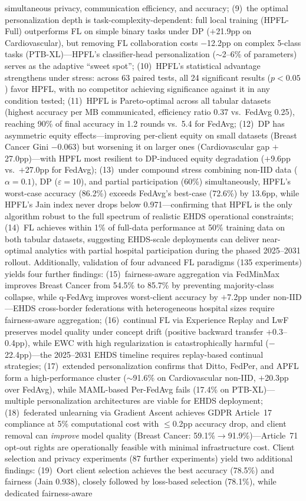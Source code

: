\documentclass[conference,a4paper]{IEEEtran}
\begin{document}
simultaneous privacy, communication efficiency, and accuracy; (9)~the optimal personalization depth is task-complexity-dependent: full local training (HPFL-Full) outperforms FL on simple binary tasks under DP ($+$21.9pp on Cardiovascular), but removing FL collaboration costs $-$12.2pp on complex 5-class tasks (PTB-XL)---HPFL's classifier-head personalization ($\sim$2--6\% of parameters) serves as the adaptive ``sweet spot''; (10)~HPFL's statistical advantage strengthens under stress: across 63 paired tests, all 24 significant results ($p{<}0.05$) favor HPFL, with no competitor achieving significance against it in any condition tested; (11)~HPFL is Pareto-optimal across all tabular datasets (highest accuracy per MB communicated, efficiency ratio 0.37 vs.\ FedAvg 0.25), reaching 90\% of final accuracy in 1.2 rounds vs.\ 5.4 for FedAvg; (12)~DP has asymmetric equity effects---improving per-client equity on small datasets (Breast Cancer Gini $-$0.063) but worsening it on larger ones (Cardiovascular gap $+$27.0pp)---with HPFL most resilient to DP-induced equity degradation ($+$9.6pp vs.\ $+$27.0pp for FedAvg); (13)~under compound stress combining non-IID data ($\alpha{=}0.1$), DP ($\varepsilon{=}10$), and partial participation (60\%) simultaneously, HPFL's worst-case accuracy (86.2\%) exceeds FedAvg's best-case (72.6\%) by 13.6pp, while HPFL's Jain index never drops below 0.971---confirming that HPFL is the only algorithm robust to the full spectrum of realistic EHDS operational constraints; (14)~FL achieves within 1\% of full-data performance at 50\% training data on both tabular datasets, suggesting EHDS-scale deployments can deliver near-optimal analytics with partial hospital participation during the phased 2025--2031 rollout. Additionally, validation of four advanced FL paradigms (135 experiments) yields four further findings: (15)~fairness-aware aggregation via FedMinMax improves Breast Cancer from 54.5\% to 85.7\% by preventing majority-class collapse, while q-FedAvg improves worst-client accuracy by $+$7.2pp under non-IID---EHDS cross-border federations with heterogeneous hospital sizes require fairness-aware aggregation; (16)~continual FL via Experience Replay and LwF preserves model quality under concept drift (positive backward transfer $+$0.3--0.4pp), while EWC with high regularization is catastrophically harmful ($-$22.4pp)---the 2025--2031 EHDS timeline requires replay-based continual strategies; (17)~extended personalization confirms that Ditto, FedPer, and APFL form a high-performance cluster ($\sim$91.6\% on Cardiovascular non-IID, $+$20.3pp over FedAvg), while MAML-based Per-FedAvg fails (17.4\% on PTB-XL)---multiple personalization architectures are viable for EHDS deployment; (18)~federated unlearning via Gradient Ascent achieves GDPR Article~17 compliance at 5\% computational cost with $\leq$0.2pp accuracy drop, and client removal can \textit{improve} model quality (Breast Cancer: 59.1\%$\to$91.9\%)---Article~71 opt-out rights are operationally feasible with minimal infrastructure cost. Client selection and privacy experiments (87 further experiments) yield two additional findings: (19)~Oort client selection achieves the best accuracy (78.5\%) and fairness (Jain 0.938), closely followed by loss-based selection (78.1\%), while dedicated fairness-aware 
\end{document}
